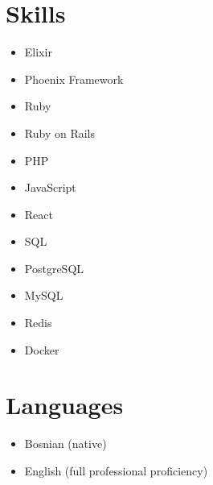 \documentclass[margin]{res}
\begin{document}
\begin{resume}
\section{Skills}
\begin{multicols}{3}
  \begin{itemize}[label={}, leftmargin=0cm, itemsep=0cm]
      \item Elixir
  \item Phoenix Framework
  \item Ruby
  \item Ruby on Rails
  \item PHP
  \item JavaScript
  \item React
  \item SQL
  \item PostgreSQL
  \item MySQL
  \item Redis
  \item Docker
  \end{itemize}
\end{multicols}

\section{Languages}
\begin{itemize}[label={}, leftmargin=0cm, itemsep=0cm]
  \item Bosnian (native)
  \item English (full professional proficiency)
\end{itemize}

\end{resume}
\end{document}
